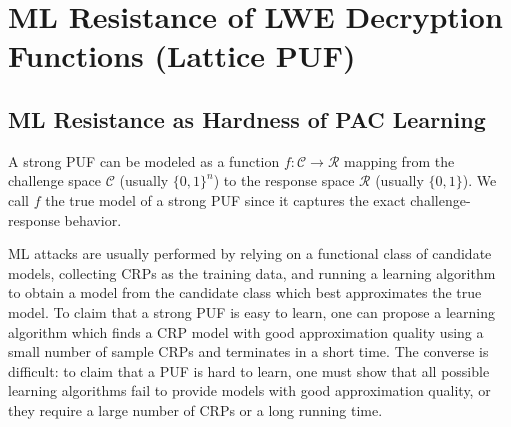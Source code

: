 \section{ML Resistance of LWE Decryption Functions  (Lattice PUF)}
\label{sec:lwe}

\subsection{ML Resistance as Hardness of PAC Learning}
A strong PUF can be modeled as a function $f:\mathcal{C}\rightarrow \mathcal{R}$ mapping from the challenge space $\mathcal{C}$ (usually $\{0,1\}^n$) to the response space $\mathcal{R}$ (usually $\{0,1\}$).
We call $f$ the true model of a strong PUF since it captures the exact challenge-response behavior. 

ML attacks are usually performed by relying on a functional class of candidate models, collecting CRPs as the training data, and running a learning algorithm to obtain a model from the candidate class which best approximates the true model. %
To claim that a strong PUF is easy to learn, one can propose a learning algorithm which finds a CRP model with good approximation quality using a small number of sample CRPs and terminates in a short time.
The converse is difficult: 
to claim that a PUF is hard to learn, one must show that all possible learning algorithms fail to provide models with good approximation quality, or they require a large number of CRPs or a long running time.


